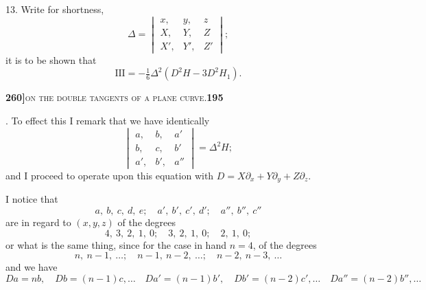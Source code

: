 \documentclass[11pt]{article}
\begin{document}
\medskip

13. Write for shortness,
\[
\Delta = \begin{vmatrix} x, & y, & z\\ X, & Y, & Z\\ X', & Y', & Z' \end{vmatrix};
\]
it is to be shown that
\[
\mathrm{III} = -\tfrac{1}{6}\Delta^2(D^2H - 3D^2H_1).
\]

\newpage

\noindent\textbf{260]}\hfill\textsc{on the double tangents of a plane curve.}\hfill\textbf{195}

\medskip

. To effect this I remark that we have identically
\[
\begin{vmatrix} a, & b, & a'\\ b, & c, & b'\\ a', & b', & a'' \end{vmatrix} = \Delta^2 H;
\]
and I proceed to operate upon this equation with $D = X\partial_x + Y\partial_y + Z\partial_z$.

I notice that
\[
a,\ b,\ c,\ d,\ e;\quad a',\ b',\ c',\ d';\quad a'',\ b'',\ c''
\]
are in regard to $(x, y, z)$ of the degrees
\[
4,\ 3,\ 2,\ 1,\ 0;\quad 3,\ 2,\ 1,\ 0;\quad 2,\ 1,\ 0;
\]
or what is the same thing, since for the case in hand $n = 4$, of the degrees
\[
n,\ n-1,\ \ldots;\quad n-1,\ n-2,\ \ldots;\quad n-2,\ n-3,\ \ldots
\]
and we have
\[
Da = nb,\quad Db = (n-1)c,\ldots\quad Da' = (n-1)b',\quad Db' = (n-2)c',\ldots\quad Da'' = (n-2)b'',\ldots
\]

\medskip
\end{document}
